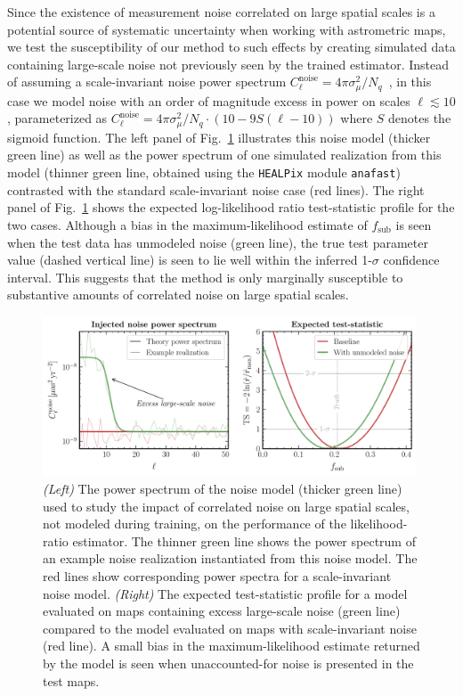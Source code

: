 \documentclass[preprint]{article}
\begin{document}
Since the existence of measurement noise correlated on large spatial scales is a potential source of systematic uncertainty when working with astrometric maps, we test the susceptibility of our method to such effects by creating simulated data containing large-scale noise not previously seen by the trained estimator. Instead of assuming a scale-invariant noise power spectrum $C_\ell^\mathrm{noise} = 4\pi \sigma_{\mu}^2 / N_q$~\cite{Mishra-Sharma:2020ynk}, in this case we model noise with an order of magnitude excess in power on scales $\ell \lesssim 10$, parameterized as $C_\ell^\mathrm{noise} = 4\pi\sigma_{\mu}^2 / N_q \cdot \left(10 - 9 S(\ell - 10)\right)$ where $S$ denotes the sigmoid function.
The left panel of Fig.~\ref{fig:noise_test} illustrates this noise model (thicker green line) as well as the power spectrum of one simulated realization from this model (thinner green line, obtained using the \texttt{HEALPix} module \texttt{anafast}) contrasted with the standard scale-invariant noise case (red lines). The right panel of Fig.~\ref{fig:noise_test} shows the expected log-likelihood ratio test-statistic profile for the two cases. Although a bias in the maximum-likelihood estimate of $f_\mathrm{sub}$ is seen when the test data has unmodeled noise (green line), the true test parameter value (dashed vertical line) is seen to lie well within the inferred 1-$\sigma$ confidence interval. This suggests that the method is only marginally susceptible to substantive amounts of correlated noise on large spatial scales.

\begin{figure}[!htbp]
\centering
\includegraphics[width=0.99\textwidth]{figures/lowell_noise}
\caption{\emph{(Left)} The power spectrum of the noise model (thicker green line) used to study the impact of correlated noise on large spatial scales, not modeled during training, on the performance of the likelihood-ratio estimator. The thinner green line shows the power spectrum of an example noise realization instantiated from this noise model. The red lines show corresponding power spectra for a scale-invariant noise model.  \emph{(Right)} The expected  test-statistic profile for a model evaluated on maps containing excess large-scale noise (green line) compared to the model evaluated on maps with scale-invariant noise (red line). A small bias in the maximum-likelihood estimate returned by the model is seen when unaccounted-for noise is presented in the test maps.}
\label{fig:noise_test}
\end{figure}
\end{document}
